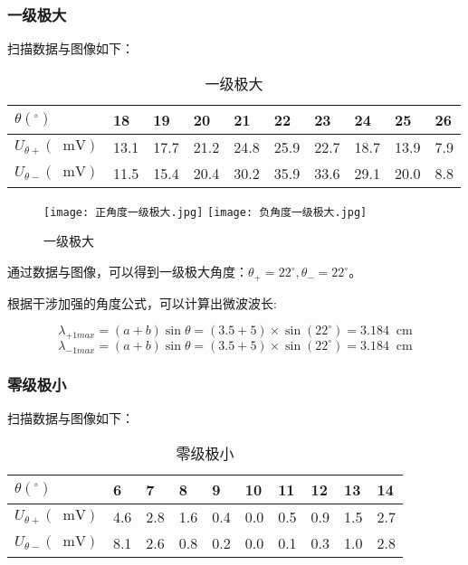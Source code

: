 \documentclass[11pt]{article}
\newcommand*{\unit}[1]{\mathop{}\!\mathrm{#1}}
\begin{document}
\subsubsection{一级极大}

扫描数据与图像如下：

\begin{table}[H]
  \centering
	\begin{tabular}{|l|l|l|l|l|l|l|l|l|l|}
		\hline
    $\theta(^\circ)$ &18    & 19    & 20    & 21    & 22    & 23    & 24    & 25    & 26 \\ \hline
		$U_{\theta+}(\unit{mV})$   & 13.1  & 17.7  & 21.2  & 24.8  & 25.9  & 22.7  & 18.7  & 13.9  & 7.9   \\ \hline
		$U_{\theta-}(\unit{mV})$   &11.5  & 15.4  & 20.4  & 30.2  & 35.9  & 33.6  & 29.1  & 20.0  & 8.8   \\ \hline
  \end{tabular}
  \caption{一级极大}
\end{table}

\begin{figure}[H]
  \centering
  \texttt{[image: 正角度一级极大.jpg]}
  \texttt{[image: 负角度一级极大.jpg]}
  \caption{一级极大}
\end{figure}

通过数据与图像，可以得到一级极大角度：$\theta_+ = 22^\circ, \theta_- = 22^\circ$。

根据干涉加强的角度公式，可以计算出微波波长:

\[\lambda_{+1max} = (a+b)\sin{\theta} = (3.5+5)\times \sin{(22^\circ)}=3.184 \unit{cm}\]
\[\lambda_{-1max} = (a+b)\sin{\theta} = (3.5+5)\times \sin{(22^\circ)}=3.184 \unit{cm}\]

\subsubsection{零级极小}

扫描数据与图像如下：

\begin{table}[H]
  \centering
	\begin{tabular}{|l|l|l|l|l|l|l|l|l|l|}
		\hline
    $\theta(^\circ)$ &6     & 7     & 8     & 9     & 10    & 11    & 12    & 13    & 14  \\ \hline
		$U_{\theta+}(\unit{mV})$   &4.6   & 2.8   & 1.6   & 0.4   & 0.0  & 0.5   & 0.9   & 1.5   & 2.7 \\ \hline
		$U_{\theta-}(\unit{mV})$   &8.1   & 2.6   & 0.8   & 0.2   & 0.0 & 0.1   & 0.3   & 1.0   & 2.8    \\ \hline
  \end{tabular}
  \caption{零级极小}
\end{table}
\end{document}
